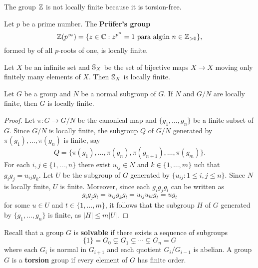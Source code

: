 \begin{example}
    The group $\mathbb{Z}$ is not locally finite because it is torsion-free.
\end{example}

\begin{example}
	Let $p$ be a prime number. 
	The \textbf{Pr\"ufer's group}  
	\[
		\mathbb{Z}(p^{\infty})=\{z\in\mathbb{C}:z^{p^n}=1\text{ para algún $n\in\mathbb{Z}_{>0}$}\}, 
	\]
	formed by of all $p$-roots of one, is locally finite. 
\end{example}

\begin{example}
	Let $X$ be an infinite set and $\mathbb{S}_X$ be the set of bijective maps $X\to
	X$ moving only finitely many elements of $X$. Then 
	$\mathbb{S}_X$ is locally finite.
\end{example}

\begin{proposition}
\label{pro:exact_LI}
	Let $G$ be a group and $N$ be a normal subgroup of $G$. If $N$ and $G/N$
	are locally finite, then $G$ is locally finite.
\end{proposition}

\begin{proof}
	Let $\pi\colon G\to G/N$ be the canonical map and $\{g_1,\dots,g_n\}$ be a finite subset of $G$. 
	Since $G/N$ is locally finite, the subgroup $Q$ of $G/N$ generated by 
	$\pi(g_1),\dots,\pi(g_n)$ is finite, say
	\[
		Q=\{\pi(g_1),\dots,\pi(g_n),\pi(g_{n+1}),\dots,\pi(g_m)\}.
	\]
	For each $i,j\in\{1,\dots,n\}$ there exist $u_{ij}\in N$ and 
	$k\in\{1,\dots,m\}$ uch that $g_ig_j=u_{ij}g_k$. Let $U$ be the subgroup of $G$
	generated by $\{u_{ij}:1\leq i,j\leq n\}$. Since $N$ is locally finite, $U$ is finite. Moreover, since 
	each $g_ig_jg_l$ can be written as 
	\[
		g_ig_jg_l=u_{ij}g_kg_l=u_{ij}u_{kl}g_t=ug_t
	\]
	for some $u\in U$ and $t\in\{1,\dots,m\}$, it follows that the subgroup 
	$H$ of $G$ generated by $\{g_1,\dots,g_n\}$ is finite, as 
	$|H|\leq m|U|$. 
\end{proof}

Recall that a group $G$ is
\textbf{solvable} if there exists a sequence
of subgroups 
\begin{equation}
	\label{eq:resoluble}
	\{1\}=G_0\subsetneq G_1\subsetneq \cdots\subsetneq G_n=G
\end{equation}
where each $G_i$ is normal in $G_{i+1}$ and each 
quotient $G_i/G_{i-1}$ is
abelian.
A group $G$ is a \textbf{torsion} group if every element of $G$
has finite order. 

